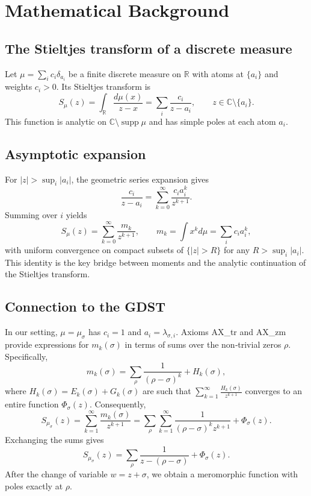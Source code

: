 \documentclass[12pt,a4paper]{article}
\begin{document}
\section{Mathematical Background}

\subsection{The Stieltjes transform of a discrete measure}
Let $\mu = \sum_{i} c_i \delta_{a_i}$ be a finite discrete measure on $\mathbb{R}$ with 
atoms at $\{a_i\}$ and weights $c_i>0$.  Its Stieltjes transform is
\[
S_\mu(z) = \int_{\mathbb{R}} \frac{d\mu(x)}{z - x} = \sum_i \frac{c_i}{z - a_i}, 
\qquad z \in \mathbb{C} \setminus \{a_i\}.
\]
This function is analytic on $\mathbb{C} \setminus \operatorname{supp}\mu$ and has 
simple poles at each atom $a_i$.

\subsection{Asymptotic expansion}
For $|z| > \sup_i |a_i|$, the geometric series expansion gives
\[
\frac{c_i}{z - a_i} = \sum_{k=0}^\infty \frac{c_i a_i^k}{z^{k+1}}.
\]
Summing over $i$ yields
\[
S_\mu(z) = \sum_{k=0}^\infty \frac{m_k}{z^{k+1}}, \qquad 
m_k = \int x^k d\mu = \sum_i c_i a_i^k,
\]
with uniform convergence on compact subsets of $\{|z| > R\}$ for any $R > \sup_i |a_i|$.  
This identity is the key bridge between moments and the analytic continuation of the 
Stieltjes transform.

\subsection{Connection to the GDST}
In our setting, $\mu = \mu_\sigma$ has $c_i = 1$ and $a_i = \lambda_{\sigma,i}$.  
Axioms AX\_tr and AX\_zm provide expressions for $m_k(\sigma)$ in terms of sums over 
the non‑trivial zeros $\rho$.  Specifically,
\[
m_k(\sigma) = \sum_{\rho} \frac{1}{(\rho-\sigma)^k} + H_k(\sigma),
\]
where $H_k(\sigma) = E_k(\sigma) + G_k(\sigma)$ are such that 
$\sum_{k=1}^\infty \frac{H_k(\sigma)}{z^{k+1}}$ converges to an entire function 
$\Phi_\sigma(z)$.  Consequently,
\[
S_{\mu_\sigma}(z) = \sum_{k=1}^\infty \frac{m_k(\sigma)}{z^{k+1}} 
= \sum_{\rho} \sum_{k=1}^\infty \frac{1}{(\rho-\sigma)^k z^{k+1}} + \Phi_\sigma(z).
\]
Exchanging the sums gives
\[
S_{\mu_\sigma}(z) = \sum_{\rho} \frac{1}{z - (\rho-\sigma)} + \Phi_\sigma(z).
\]
After the change of variable $w = z + \sigma$, we obtain a meromorphic function 
with poles exactly at $\rho$.
\end{document}
